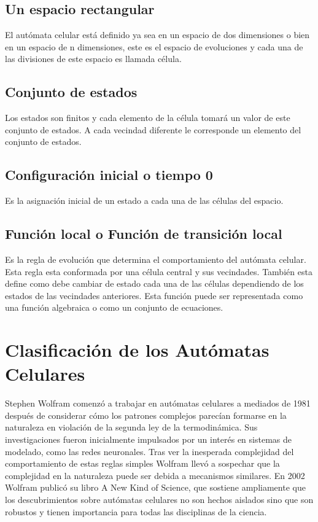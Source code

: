 \documentclass[10pt]{article}
\begin{document}
		\subsection{Un espacio rectangular}
		El autómata celular está definido ya sea en un espacio de dos dimensiones o bien en un espacio de n dimensiones, este es el espacio de evoluciones y cada una de las divisiones de este espacio es llamada célula.
		
		\subsection{Conjunto de estados}
		Los estados son finitos y cada elemento de la célula tomará un valor de este conjunto de estados. A cada vecindad diferente le corresponde un elemento del conjunto de estados.
 	
		\subsection{Configuración inicial o tiempo 0}
		Es la asignación inicial de un estado a cada una de las células del espacio.		
		
		\subsection{Función local o Función de transición local}
		Es la regla de evolución que determina el comportamiento del autómata celular. Esta regla esta conformada por una célula central y sus vecindades. También esta define como debe cambiar de estado cada una de las células dependiendo de los estados de las vecindades anteriores. Esta función puede ser representada como una función algebraica o como un conjunto de ecuaciones. 
        
	
	\section{Clasificación de los Autómatas Celulares}
	Stephen Wolfram comenzó a trabajar en autómatas celulares a mediados de 1981 después de considerar cómo los patrones complejos parecían formarse en la naturaleza en violación de la segunda ley de la termodinámica. Sus investigaciones fueron inicialmente impulsados por un interés en sistemas de modelado, como las redes neuronales. Tras ver la inesperada complejidad del comportamiento de estas reglas simples Wolfram llevó a sospechar que la complejidad en la naturaleza puede ser debida a mecanismos similares. En 2002 Wolfram publicó su libro A New Kind of Science, que sostiene ampliamente que los descubrimientos sobre autómatas celulares no son hechos aislados sino que son robustos y tienen importancia para todas las disciplinas de la ciencia. 
\end{document}
